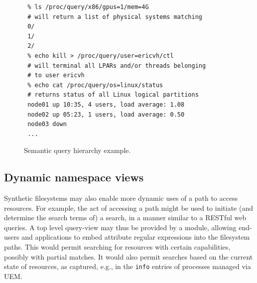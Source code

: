 \documentclass{sig-alternate}
\begin{document}
%

\begin{figure}
\begin{center}
\begin{verbatim}
 % ls /proc/query/x86/gpus=1/mem=4G
 # will return a list of physical systems matching
 0/
 1/
 2/
 % echo kill > /proc/query/user=ericvh/ctl
 # will terminal all LPARs and/or threads belonging 
 # to user ericvh
 % echo cat /proc/query/os=linux/status
 # returns status of all Linux logical partitions
 node01 up 10:35, 4 users, load average: 1.08 
 node02 up 05:23, 1 users, load average: 0.50
 node03 down
 ...
\end{verbatim}
\end{center}
\vspace{-0.1in}
\caption{Semantic query hierarchy example.}
\label{fig:query}
\end{figure}

\subsection{Dynamic namespace views}
Synthetic filesystems may also enable more dynamic uses of a path to
access resources. For example, the act of accessing a path might be used
to initiate (and determine the search terms of) a search, in a manner similar to a 
RESTful web queries.
A top level query-view may thus be provided by a module, allowing end-users
and applications to embed attribute regular expressions into the filesystem
paths.
This would permit searching for resources with certain capabilities, possibly with partial matches.
It would also permit searches based on 
the current state of resources, as captured, e.g., in the {\tt info} entries
of processes managed via UEM.
\end{document}
